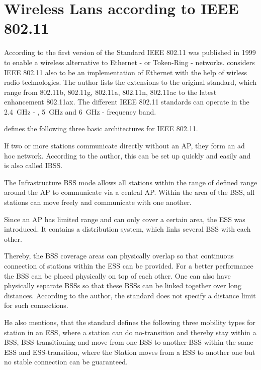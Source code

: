 \documentclass[]{nsm-thesis}
\begin{document}
\section{Wireless Lans according to IEEE 802.11}
According to \textcite{kauffels_wireless_2002} the first version of the Standard IEEE 802.11 was published in 1999 to enable a wireless alternative to Ethernet - or Token-Ring - networks.
\textcite{sauter_wireless_2022} considers IEEE 802.11 also to be an implementation of Ethernet with the help of wirless radio technologies. The author lists the extensions to the original standard, which range from 802.11b, 802.11g, 802.11a, 802.11n, 802.11ac to the latest enhancement 802.11ax. The different IEEE 802.11 standards can operate in the  \SI{2.4}{\giga\hertz} - , \SI{5}{\giga\hertz} and \SI{6}{\giga\hertz} - frequency band. 


\textcite{kauffels_wireless_2002} defines the following three basic architectures for IEEE 802.11.

If two or more stations communicate directly without an AP, they form an ad hoc network. According to the author, this can be set up quickly and easily and is also called \ac{IBSS}.

The Infrastructure \ac{BSS} mode allows all stations within the range of defined range around the \ac{AP} to communicate via a central \ac{AP}. Within the area of the \ac{BSS}, all stations can move freely and communicate with one another.

Since an \ac{AP} has limited range and can only cover a certain area, the \ac{ESS} was introduced. It contains a distribution system, which links several \ac{BSS} with each other.

Thereby, the BSS coverage areas can physically overlap so that continuous connection of stations within the ESS can be provided. For a better performance the \ac{BSS} can be placed physically on top of each other. One can also have physically separate \ac{BSS}s so that these \ac{BSS}s can be linked together over long distances. According to the author, the standard does not specify a distance limit for such connections. 

He also mentions, that the standard defines the following three mobility types for station in an \ac{ESS}, where a station can do no-transition and thereby stay within a \ac{BSS}, \ac{BSS}-transitioning and move from one \ac{BSS} to another \ac{BSS} within the same \ac{ESS} and \ac{ESS}-transition, where the Station moves from a \ac{ESS} to another one but no stable connection can be guaranteed.
\end{document}
